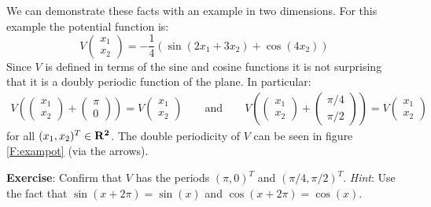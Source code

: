    We can demonstrate these facts with an example in two dimensions.  For
this example the potential function is:
\begin{equation}\label{E:exampot}
   V
\begin{pmatrix}
x_1 \\ x_2 
\end{pmatrix}
= -\frac{1}{4} \left( \sin(2 x_1 + 3 x_2) + \cos(4 x_2) \right)
\end{equation}
Since $V$ is defined in terms of the sine and cosine functions it is not 
surprising that it is a doubly periodic function of the plane.  In particular:
\begin{eqnarray*}
   V \left(
\begin{pmatrix}
x_1 \\ x_2
\end{pmatrix}
+
\begin{pmatrix}
\pi \\ 0
\end{pmatrix} \right)
= V
\begin{pmatrix}
x_1\\ x_2
\end{pmatrix} 
\qquad \mathrm{and} \qquad 
   V \left(
\begin{pmatrix}
x_1 \\ x_2 
\end{pmatrix}
+
\begin{pmatrix}
\pi/4 \\ \pi/2
\end{pmatrix} \right)
= V
\begin{pmatrix}
x_1\\ x_2
\end{pmatrix}
\end{eqnarray*}
for all $(x_1, x_2)^T \in \bf{R}^2$.  The double periodicity of $V$ can be seen
in figure \ref{F:exampot} (via the arrows).

\bigskip

\noindent
{\bf Exercise}: Confirm that $V$ has the periods $(\pi,0)^T$ and $(\pi/4, 
\pi/2)^T$.  \emph{Hint}: Use the fact that $\sin(x+2\pi)=\sin(x)$ and 
$\cos(x+2\pi) = \cos(x)$.

\bigskip

